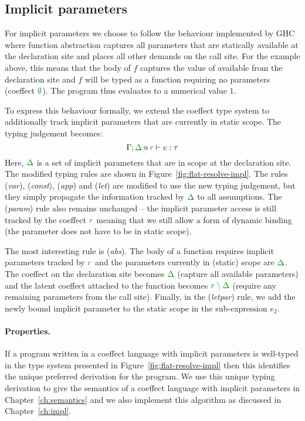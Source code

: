 
\subsection{Implicit parameters}
\label{sec:flat-unique-impl}

For implicit parameters we choose to follow the behaviour implemented by GHC~\cite{app-implicit-parameters}
where function abstraction captures all parameters that are statically available at the declaration site
and places all other demands on the call site. For the example above, this means
that the body of $f$ captures the value of  available from the declaration site
and $f$ will be typed as a function requiring no parameters (coeffect $\cclrd{\emptyset}$). The
program thus evaluates to a numerical value $1$.

To express this behaviour formally, we extend the coeffect type system to additionally track
implicit parameters that are currently in static scope. The typing judgement becomes:
%
\begin{equation*}
\coctx{\Gamma;\cclrd{\Delta}}{\cclrd{r}} \vdash e : \tau
\end{equation*}
%
Here, $\cclrd{\Delta}$ is a set of implicit parameters that are in scope at the declaration site.
The modified typing rules are shown in Figure~\ref{fig:flat-resolve-impl}. The rules (\emph{var}),
(\emph{const}), (\emph{app}) and (\emph{let}) are modified to use the new typing judgement, but they
simply propagate the information tracked by $\cclrd{\Delta}$ to all assumptions. The (\emph{param})
rule also remains unchanged -- the implicit parameter access is still tracked by the coeffect
$\cclrd{r}$ meaning that we still allow a form of dynamic binding (the parameter does not have
to be in static scope).

The most interesting rule is (\emph{abs}). The body of a function requires implicit parameters
tracked by $\cclrd{r}$ and the parameters currently in (static) scope are $\cclrd{\Delta}$.
The coeffect on the declaration site becomes $\cclrd{\Delta}$ (capture all available parameters)
and the latent coeffect attached to the function becomes $\cclrd{r\setminus\Delta}$ (require any
remaining parameters from the call site). Finally, in the (\emph{letpar}) rule, we add the newly
bound implicit parameter  to the static scope in the sub-expression $e_2$.

\paragraph{Properties.}
If a program written in a coeffect language with implicit parameters is well-typed in the type
system presented in Figure~\ref{fig:flat-resolve-impl} then this identifies the unique preferred
derivation for the program. We use this unique typing derivation to give the semantics of a coeffect
language with implicit parameters in Chapter~\ref{ch:semantics} and we also implement this algorithm
as discussed in Chapter~\ref{ch:impl}.

